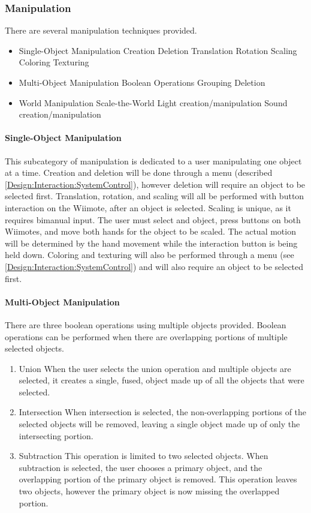 \subsubsection{Manipulation}
\label{Design:Interaction:Manipulation}
There are several manipulation techniques provided.
\begin{itemize}
	\item Single-Object Manipulation
		\subitem Creation
		\subitem Deletion
		\subitem Translation
		\subitem Rotation
		\subitem Scaling
		\subitem Coloring
		\subitem Texturing
	\item Multi-Object Manipulation
		\subitem Boolean Operations
		\subitem Grouping
		\subitem Deletion
	\item World Manipulation
		\subitem Scale-the-World
		\subitem Light creation/manipulation
		\subitem Sound creation/manipulation
\end{itemize}

\paragraph{Single-Object Manipulation}
This subcategory of manipulation is dedicated to a user manipulating one object at a time.
Creation and deletion will be done through a menu (described \ref{Design:Interaction:SystemControl}), however deletion will require an object to be selected first.
Translation, rotation, and scaling will all be performed with button interaction on the Wiimote, after an object is selected.
Scaling is unique, as it requires bimanual input.
The user must select and object, press buttons on both Wiimotes, and move both hands for the object to be scaled.
The actual motion will be determined by the hand movement while the interaction button is being held down.
Coloring and texturing will also be performed through a menu (see \ref{Design:Interaction:SystemControl}) and will also require an object to be selected first.

\paragraph{Multi-Object Manipulation}
There are three boolean operations using multiple objects provided.  Boolean operations can be performed when there are overlapping portions of multiple selected objects.
\begin{enumerate}
	\item Union
	\subitem When the user selects the union operation and multiple objects are selected, it creates a single, fused, object made up of all the objects that were selected.
	\item Intersection
	\subitem When intersection is selected, the non-overlapping portions of the selected objects will be removed, leaving a single object made up of only the intersecting portion.
	\item Subtraction
	\subitem This operation is limited to two selected objects.  When subtraction is selected, the user chooses a primary object, and the overlapping portion of the primary object is removed.  This operation leaves two objects, however the primary object is now missing the overlapped portion.
\end{enumerate}

